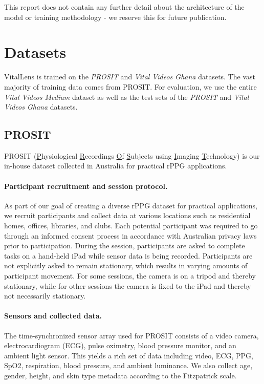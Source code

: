 \documentclass{article}
\begin{document}
This report does not contain any further detail about the architecture of the model or training methodology - we reserve this for future publication.

\section{Datasets}
\label{sec:datasets}

VitalLens is trained on the \textit{PROSIT} and \textit{Vital Videos Ghana} datasets.
The vast majority of training data comes from PROSIT.
For evaluation, we use the entire \textit{Vital Videos Medium} dataset as well as the test sets of the \textit{PROSIT} and \textit{Vital Videos Ghana} datasets.

\subsection{PROSIT}

PROSIT (\underline{P}hysiological \underline{R}ecordings \underline{O}f \underline{S}ubjects using \underline{I}maging \underline{T}echnology) is our in-house dataset collected in Australia for practical rPPG applications.

\paragraph{Participant recruitment and session protocol.} 
As part of our goal of creating a diverse rPPG dataset for practical applications, we recruit participants and collect data at various locations such as residential homes, offices, libraries, and clubs.
Each potential participant was required to go through an informed consent process in accordance with Australian privacy laws prior to participation.
During the session, participants are asked to complete tasks on a hand-held iPad while sensor data is being recorded.
Participants are not explicitly asked to remain stationary, which results in varying amounts of participant movement.
For some sessions, the camera is on a tripod and thereby stationary, while for other sessions the camera is fixed to the iPad and thereby not necessarily stationary.

\paragraph{Sensors and collected data.}
The time-synchronized sensor array used for PROSIT consists of a video camera, electrocardiogram (ECG), pulse oximetry, blood pressure monitor, and an ambient light sensor.
This yields a rich set of data including video, ECG, PPG, SpO2, respiration, blood pressure, and ambient luminance.
We also collect age, gender, height, and skin type metadata according to the Fitzpatrick scale.
\end{document}
